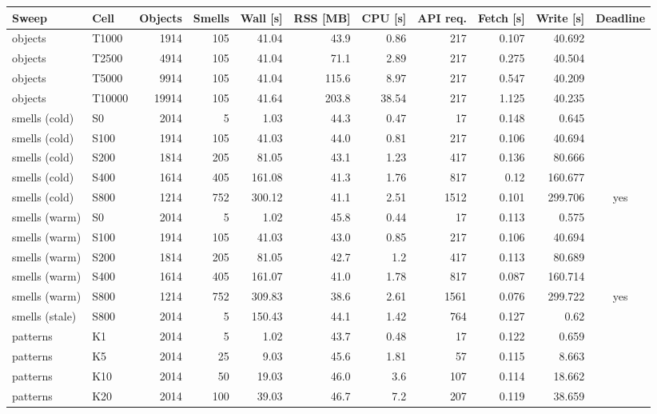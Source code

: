 \begin{tabular}{llrrrrrrrrc}
\toprule
Sweep & Cell & Objects & Smells & Wall [s] & RSS [MB] & CPU [s] & API req. & Fetch [s] & Write [s] & Deadline \\
\midrule
objects & T1000 & 1914 & 105 & 41.04 & 43.9 & 0.86 & 217 & 0.107 & 40.692 &  \\
objects & T2500 & 4914 & 105 & 41.04 & 71.1 & 2.89 & 217 & 0.275 & 40.504 &  \\
objects & T5000 & 9914 & 105 & 41.04 & 115.6 & 8.97 & 217 & 0.547 & 40.209 &  \\
objects & T10000 & 19914 & 105 & 41.64 & 203.8 & 38.54 & 217 & 1.125 & 40.235 &  \\
\midrule
smells (cold) & S0 & 2014 & 5 & 1.03 & 44.3 & 0.47 & 17 & 0.148 & 0.645 &  \\
smells (cold) & S100 & 1914 & 105 & 41.03 & 44.0 & 0.81 & 217 & 0.106 & 40.694 &  \\
smells (cold) & S200 & 1814 & 205 & 81.05 & 43.1 & 1.23 & 417 & 0.136 & 80.666 &  \\
smells (cold) & S400 & 1614 & 405 & 161.08 & 41.3 & 1.76 & 817 & 0.12 & 160.677 &  \\
smells (cold) & S800 & 1214 & 752 & 300.12 & 41.1 & 2.51 & 1512 & 0.101 & 299.706 & yes \\
\midrule
smells (warm) & S0 & 2014 & 5 & 1.02 & 45.8 & 0.44 & 17 & 0.113 & 0.575 &  \\
smells (warm) & S100 & 1914 & 105 & 41.03 & 43.0 & 0.85 & 217 & 0.106 & 40.694 &  \\
smells (warm) & S200 & 1814 & 205 & 81.05 & 42.7 & 1.2 & 417 & 0.113 & 80.689 &  \\
smells (warm) & S400 & 1614 & 405 & 161.07 & 41.0 & 1.78 & 817 & 0.087 & 160.714 &  \\
smells (warm) & S800 & 1214 & 752 & 309.83 & 38.6 & 2.61 & 1561 & 0.076 & 299.722 & yes \\
\midrule
smells (stale) & S800 & 2014 & 5 & 150.43 & 44.1 & 1.42 & 764 & 0.127 & 0.62 &  \\
\midrule
patterns & K1 & 2014 & 5 & 1.02 & 43.7 & 0.48 & 17 & 0.122 & 0.659 &  \\
patterns & K5 & 2014 & 25 & 9.03 & 45.6 & 1.81 & 57 & 0.115 & 8.663 &  \\
patterns & K10 & 2014 & 50 & 19.03 & 46.0 & 3.6 & 107 & 0.114 & 18.662 &  \\
patterns & K20 & 2014 & 100 & 39.03 & 46.7 & 7.2 & 207 & 0.119 & 38.659 &  \\
\bottomrule
\end{tabular}
